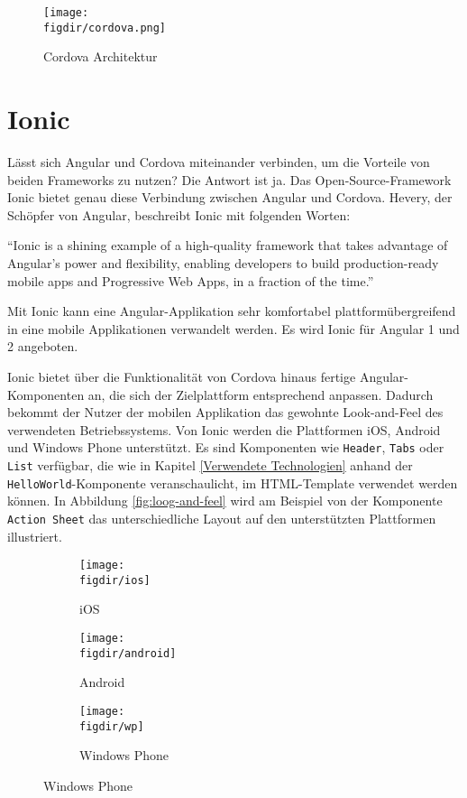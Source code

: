 \begin{figure}[htb]
\centering
\caption{Cordova Architektur \cite{cordova}}
\label{fig:cordova}
\texttt{[image: \\figdir/cordova.png]}
\end{figure}

\section{Ionic}

Lässt sich Angular und Cordova miteinander verbinden, um die Vorteile von beiden Frameworks zu nutzen? Die Antwort ist ja. Das Open-Source-Framework Ionic bietet genau diese Verbindung zwischen Angular und Cordova. Hevery, der Schöpfer von Angular, beschreibt Ionic mit folgenden Worten:

\begin{citeenv}
	``Ionic is a shining example of a high-quality framework that takes advantage of Angular's power and flexibility, enabling developers to build production-ready mobile apps and Progressive Web Apps, in a fraction of the time.'' \cite{ionic:qutation}
\end{citeenv}


Mit Ionic kann eine Angular-Applikation sehr komfortabel plattformübergreifend in eine mobile Applikationen verwandelt werden. Es wird Ionic für Angular 1 und 2 angeboten.

Ionic bietet über die Funktionalität von Cordova hinaus fertige Angular-Komponenten an, die sich der Zielplattform entsprechend anpassen. Dadurch bekommt der Nutzer der mobilen Applikation das gewohnte Look-and-Feel des verwendeten Betriebssystems. Von Ionic werden die Plattformen iOS, Android und Windows Phone unterstützt. Es sind Komponenten wie \texttt{Header}, \texttt{Tabs} oder \texttt{List} verfügbar, die wie in Kapitel \ref{Verwendete Technologien} anhand der \texttt{HelloWorld}-Komponente veranschaulicht, im HTML-Template verwendet werden können. In Abbildung \ref{fig:loog-and-feel} wird am Beispiel von der Komponente \texttt{Action Sheet} das unterschiedliche Layout auf den unterstützten Plattformen illustriert.

\begin{figure}[htb]
\centering
\caption{Look-and-feel von Ionic auf verschiedenen Plattformen am Beispiel von Action Sheets}
\label{fig:loog-and-feel}
\begin{subfigure}{0.32\textwidth}
\texttt{[image: \\figdir/ios]}
\caption{iOS}
\end{subfigure}
\begin{subfigure}{0.32\textwidth}
\texttt{[image: \\figdir/android]}
\caption{Android}
\end{subfigure}
\begin{subfigure}{0.32\textwidth}
\texttt{[image: \\figdir/wp]}
\caption{Windows Phone}
\end{subfigure}
\end{figure}

